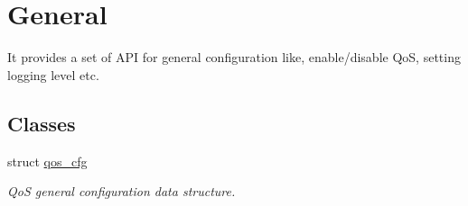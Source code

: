 \hypertarget{group__FAPI__QOS__GENERAL}{\section{General}
\label{group__FAPI__QOS__GENERAL}
}


It provides a set of A\-P\-I for general configuration like, enable/disable Qo\-S, setting logging level etc.  


\subsection*{Classes}
\begin{DoxyCompactItemize}
\item 
struct \hyperlink{structqos__cfg}{qos\-\_\-cfg}
\begin{DoxyCompactList}\small\item\em Qo\-S general configuration data structure. \end{DoxyCompactList}\end{DoxyCompactItemize}
